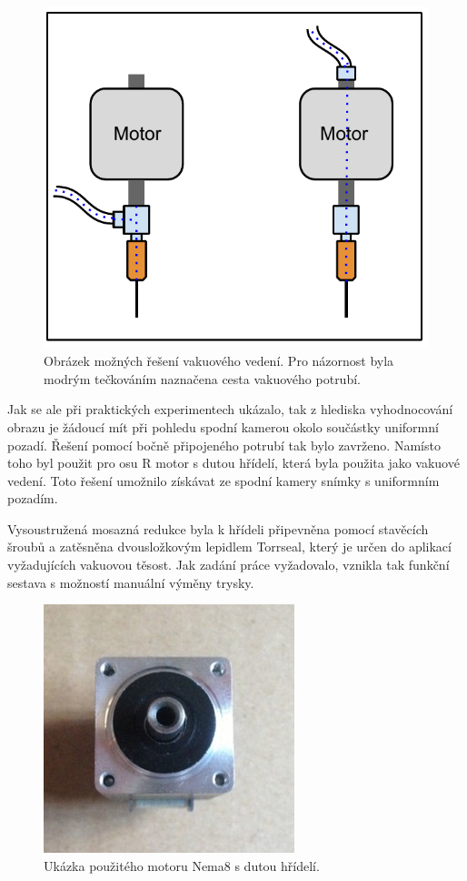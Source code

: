 \begin{figure}[H]
  \centering
    \includegraphics[width=0.6\linewidth]{pdf/motorR2.pdf}%
    \caption{Obrázek možných řešení vakuového vedení. Pro názornost byla modrým tečkováním naznačena cesta vakuového potrubí.}
    \label{fig:sensor}
\end{figure}

Jak se ale při praktických experimentech ukázalo, tak z hlediska vyhodnocování obrazu je žádoucí mít při pohledu spodní kamerou okolo součástky uniformní pozadí. Řešení pomocí bočně připojeného potrubí tak bylo zavrženo. 
Namísto toho byl použit pro osu R motor s dutou hřídelí, která byla použita jako vakuové vedení. Toto řešení umožnilo získávat ze spodní kamery snímky s uniformním pozadím. 

Vysoustružená mosazná redukce byla k hřídeli připevněna pomocí stavěcích šroubů a zatěsněna dvousložkovým lepidlem Torrseal, který je určen do aplikací vyžadujících vakuovou těsost.
Jak zadání práce vyžadovalo, vznikla tak funkční sestava s možností manuální výměny trysky.

\begin{figure}[h!]
  \centering
    \includegraphics[width=0.6\linewidth]{obrazky/robotdigg_nema8.jpg}%
    \caption{Ukázka použitého motoru Nema8 s dutou hřídelí.}
    \label{fig:nema8}
\end{figure}

